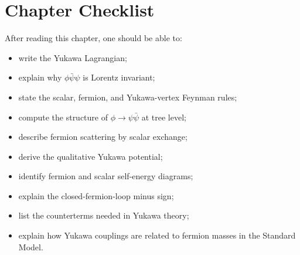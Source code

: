 \section{Chapter Checklist}

After reading this chapter, one should be able to:
\begin{itemize}
    \item write the Yukawa Lagrangian;
    \item explain why \(\phi\bar\psi\psi\) is Lorentz invariant;
    \item state the scalar, fermion, and Yukawa-vertex Feynman rules;
    \item compute the structure of \(\phi\to\psi\bar\psi\) at tree level;
    \item describe fermion scattering by scalar exchange;
    \item derive the qualitative Yukawa potential;
    \item identify fermion and scalar self-energy diagrams;
    \item explain the closed-fermion-loop minus sign;
    \item list the counterterms needed in Yukawa theory;
    \item explain how Yukawa couplings are related to fermion masses in the
    Standard Model.
\end{itemize}
